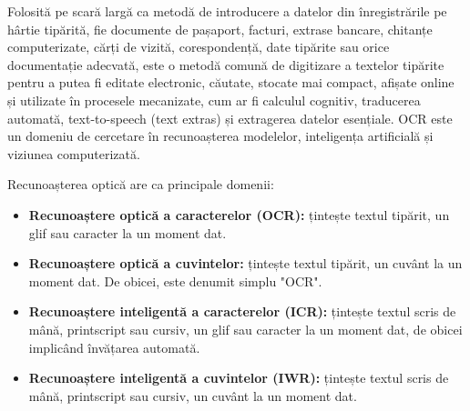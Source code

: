 \documentclass[a4paper,12pt]{report}
\begin{document}
Folosită pe scară largă ca metodă de introducere a datelor din înregistrările pe hârtie tipărită, fie documente de pașaport, facturi, extrase bancare, chitanțe computerizate, cărți de vizită, corespondență, date tipărite sau orice documentație adecvată, este o metodă comună de digitizare a textelor tipărite pentru a putea fi editate electronic, căutate, stocate mai compact, afișate online și utilizate în procesele mecanizate, cum ar fi calculul cognitiv, traducerea automată, text-to-speech (text extras) și extragerea datelor esențiale. OCR este un domeniu de cercetare în recunoașterea modelelor, inteligența artificială și viziunea computerizată.

Recunoașterea optică are ca principale domenii:
\begin{itemize}
    \item \textbf{Recunoaștere optică a caracterelor (OCR):} țintește textul tipărit, un glif sau caracter la un moment dat.
    \item \textbf{Recunoaștere optică a cuvintelor:} țintește textul tipărit, un cuvânt la un moment dat. De obicei, este denumit simplu "OCR".
    \item \textbf{Recunoaștere inteligentă a caracterelor (ICR):} țintește textul scris de mână, printscript sau cursiv, un glif sau caracter la un moment dat, de obicei implicând învățarea automată.
    \item \textbf{Recunoaștere inteligentă a cuvintelor (IWR):} țintește textul scris de mână, printscript sau cursiv, un cuvânt la un moment dat.
\end{itemize}
\end{document}

